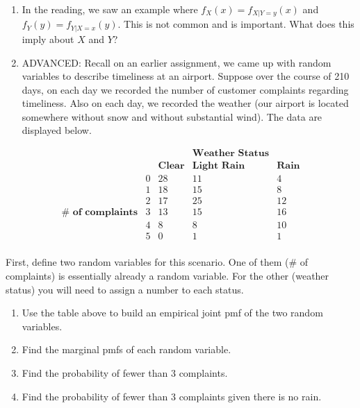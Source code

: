 \documentclass[
  letterpaper,
  DIV=11,
  numbers=noendperiod]{scrreprt}
\providecommand{\tightlist}{%
  \setlength{\itemsep}{0pt}\setlength{\parskip}{0pt}}\usepackage{longtable,booktabs,array}
\begin{document}
\begin{enumerate}
\def\labelenumi{\arabic{enumi}.}
\setcounter{enumi}{1}
\item
  In the reading, we saw an example where \(f_X(x)=f_{X|Y=y}(x)\) and
  \(f_Y(y)=f_{Y|X=x}(y)\). This is not common and is important. What
  does this imply about \(X\) and \(Y\)?
\item
  ADVANCED: Recall on an earlier assignment, we came up with random
  variables to describe timeliness at an airport. Suppose over the
  course of 210 days, on each day we recorded the number of customer
  complaints regarding timeliness. Also on each day, we recorded the
  weather (our airport is located somewhere without snow and without
  substantial wind). The data are displayed below.
\end{enumerate}

\[
\begin{array}{cc|cc} & & &\textbf{Weather Status}  
\\ & & \textbf{Clear} & \textbf{Light Rain} & \textbf{Rain}  
\\ & \hline0 & 28 & 11 & 4  
\\ & 1 & 18 & 15 & 8  
\\ & 2 & 17 & 25 & 12  
\\ \textbf{# of complaints} & 3 & 13 & 15 & 16  \\
& 4 & 8 & 8 & 10  
\\ & 5 & 0 & 1 & 1 
\\ \end{array} 
\]

First, define two random variables for this scenario. One of them (\# of
complaints) is essentially already a random variable. For the other
(weather status) you will need to assign a number to each status.

\begin{enumerate}
\def\labelenumi{\alph{enumi}.}
\tightlist
\item
  Use the table above to build an empirical joint pmf of the two random
  variables.\\
\item
  Find the marginal pmfs of each random variable.\\
\item
  Find the probability of fewer than 3 complaints.\\
\item
  Find the probability of fewer than 3 complaints given there is no
  rain.
\end{enumerate}
\end{document}
